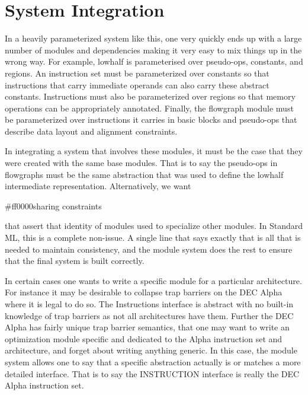 \section{System Integration}
  In a heavily parameterized system like this, one very quickly ends up
  with a large number of modules and dependencies making it very
  easy to mix things up in the wrong way.  
   For example, lowhalf is parameterised over pseudo-ops,
  constants, and regions. An instruction set must be parameterized
  over constants so that instructions that carry immediate operands
  can also carry these abstract constants. Instructions must also be
  parameterized over regions so that memory operations can be
  appropriately annotated. Finally, the flowgraph module must be
  parameterized over instructions it carries in basic blocks and
  pseudo-ops that describe data layout and alignment constraints.

  In integrating a system that involves these modules, it must be the
  case that they were created with the same base modules. That is to
  say the pseudo-ops in flowgraphs must be the same abstraction that
  was used to define the lowhalf intermediate
  representation. Alternatively, we want 
  \begin{color}{#ff0000}sharing constraints\end{color} 
  that assert that identity of modules used to
  specialize other modules. In Standard ML, this is a complete
  non-issue. A single line that says exactly that is all that is
  needed to maintain consistency, and the module system does the rest
  to ensure that the final system is built correctly.

  In certain cases one wants to write a specific module for a
  particular architecture. For instance it may be desirable to collapse
  trap barriers on the DEC Alpha where it is legal to do so. The
  Instructions interface is abstract with no built-in knowledge of 
  trap barriers as not all architectures have them.
  Further the DEC Alpha has fairly unique trap barrier semantics,
  that one may want to write an optimization module specific and
  dedicated to the Alpha instruction set and architecture, and forget
  about writing anything generic. In this case, the module
  system allows one to say that a specific abstraction actually is or
  matches a more detailed interface. That is to say the INSTRUCTION
  interface is really the DEC Alpha instruction set.
